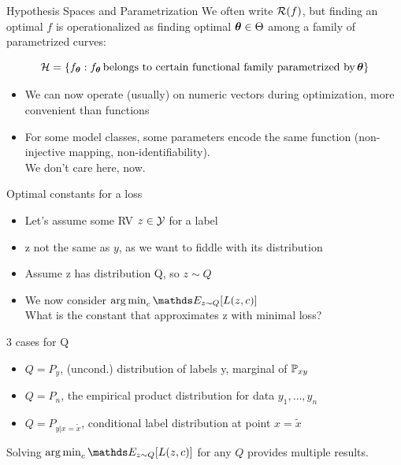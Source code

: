 \documentclass[11pt,compress,t,notes=noshow, xcolor=table]{beamer}
\begin{document}
\begin{vbframe}{Hypothesis Spaces and Parametrization}
We often write $\mathcal{R}(f)$, but finding an optimal $f$ is operationalized as finding optimal $\bm{\theta} \in \Theta$ among a family of parametrized curves:

$$\mathcal{H} = \{f_{\bm{\theta}}: f_{\bm{\theta}}\,\text{belongs to certain functional family parametrized by}\,\bm{\theta}\}$$

\begin{itemize}
    \item We can now operate (usually) on numeric vectors
    during optimization, more convenient than functions
\item For some model classes, some parameters encode the same function (non-injective mapping, non-identifiability). \\
We don't care here, now. 
\end{itemize}

\end{vbframe}

\begin{vbframe}{Optimal constants for a loss}

\begin{itemize}
\item Let's assume some RV $z \in \mathcal{Y}$ for a label
\item z not the same as $y$, as we want to fiddle with its distribution
\item Assume z has distribution Q, so $z \sim Q$
\item We now consider $\argmin_c \E_{z \sim Q}[L(z, c)]$\\
What is the constant that approximates z with minimal loss?
\end{itemize}

\lz

3 cases for Q
\begin{itemize}
\item $Q = P_y$, (uncond.) distribution of labels y, marginal of $\mathbb{P}_{xy}$
\item $Q = P_n$, the empirical product distribution for data $y_1, \ldots, y_n$
\item $Q = P_{y | x = \tilde{x}}$, conditional label distribution at point $x = \tilde{x}$
\end{itemize}

\lz

Solving $\argmin_c \E_{z \sim Q}[L(z, c)]$ for any $Q$ provides 
multiple results.


\end{vbframe}
\end{document}
